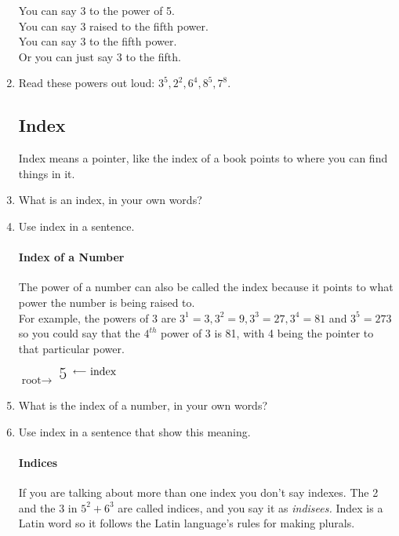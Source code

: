 \documentclass[12pt]{article}
\begin{document}
\begin{enumerate}
You can say 3 to the power of 5.\\

You can say 3 raised to the fifth power.\\

You can say 3 to the fifth power.\\

Or you can just say 3 to the fifth.

\item Read these powers out loud: $3^5, 2^2, 6^4, 8^5, 7^8.$

\subsection*{Index}
Index means a pointer, like the index of a book points to where you can find things in it.

\item What is an index, in your own words?
\item Use index in a sentence.

\paragraph{Index of a Number}
The power of a number can also be called the index because it points to what power the number is being raised to.\\

For example, the powers of 3 are $3^1=3, 3^2=9, 3^3=27, 3^4=81$ and $3^5=273$ so you could say that the $4^{th}$ power of 3 is 81, with 4 being the pointer to that particular power.\\

\begin{center}
$\text{root}\rightarrow$
{\fontsize{30}{34}}
$\textsuperscript{{\fontsize{15}{20}\selectfont 5} \ \raisebox{1.5ex}{$\longleftarrow$\ }}\raisebox{0.8ex}{\textsuperscript{\normalsize{\text{index}}}}$
\normalsize
\end{center}

\item What is the index of a number, in your own words?
\item Use index in a sentence that show this meaning.

\paragraph{Indices}
If you are talking about more than one index you don’t say indexes. The 2 and the 3 in $5^2+6^3$ are called indices, and you say it as \textit{indisees.} Index is  a Latin word so it follows the Latin language's rules for making plurals.


\end{enumerate}
\end{document}
